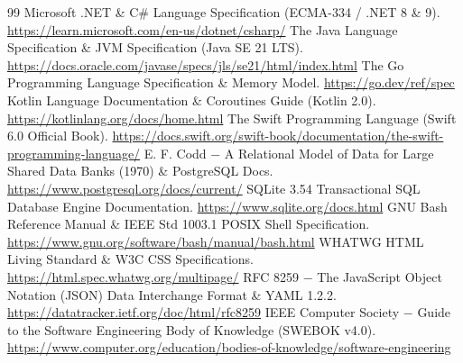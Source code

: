 \documentclass{book}
\begin{document}
\begin{thebibliography}{99}
 Microsoft .NET \& C\# Language Specification (ECMA-334 / .NET 8 \& 9). \url{https://learn.microsoft.com/en-us/dotnet/csharp/}
 The Java Language Specification \& JVM Specification (Java SE 21 LTS). \url{https://docs.oracle.com/javase/specs/jls/se21/html/index.html}
 The Go Programming Language Specification \& Memory Model. \url{https://go.dev/ref/spec}
 Kotlin Language Documentation \& Coroutines Guide (Kotlin 2.0). \url{https://kotlinlang.org/docs/home.html}
 The Swift Programming Language (Swift 6.0 Official Book). \url{https://docs.swift.org/swift-book/documentation/the-swift-programming-language/}
 E. F. Codd \(-\) A Relational Model of Data for Large Shared Data Banks (1970) \& PostgreSQL Docs. \url{https://www.postgresql.org/docs/current/}
 SQLite 3.54 Transactional SQL Database Engine Documentation. \url{https://www.sqlite.org/docs.html}
 GNU Bash Reference Manual \& IEEE Std 1003.1 POSIX Shell Specification. \url{https://www.gnu.org/software/bash/manual/bash.html}
 WHATWG HTML Living Standard \& W3C CSS Specifications. \url{https://html.spec.whatwg.org/multipage/}
 RFC 8259 \(-\) The JavaScript Object Notation (JSON) Data Interchange Format \& YAML 1.2.2. \url{https://datatracker.ietf.org/doc/html/rfc8259}
 IEEE Computer Society \(-\) Guide to the Software Engineering Body of Knowledge (SWEBOK v4.0). \url{https://www.computer.org/education/bodies-of-knowledge/software-engineering}
\end{thebibliography}
\end{document}
